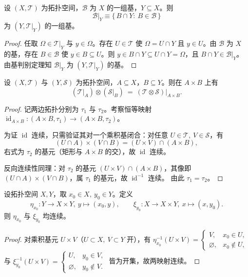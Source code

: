 \documentclass[lang=cn,a4paper,newtx,figureplace=section,tableplace=section]{elegantbook}
\begin{document}
 \begin{proposition}[基在子空间中的限制仍为基]\label{prop:subspace-basis-from-basis}
  设 $(X,\mathcal T)$ 为拓扑空间，$\mathcal B$ 为 $X$ 的一组基，$Y\subseteq X$。则
  \[
   \mathcal B|_Y\equiv\{\,B\cap Y:\ B\in\mathcal B\,\}
  \]
  为 $(Y,\mathcal T|_Y)$ 的一组基。
 \end{proposition}
 \begin{proof}
  任取 $\Omega\in\mathcal T|_Y$ 与 $y\in\Omega$。存在 $U\in\mathcal T$ 使 $\Omega=U\cap Y$ 且 $y\in U$。由 $\mathcal B$ 为 $X$ 的基，存在 $B\in\mathcal B$ 使 $y\in B\subseteq U$。则 $y\in B\cap Y\subseteq U\cap Y=\Omega$，且 $B\cap Y\in\mathcal B|_Y$。由基判别定理知 $\mathcal B|_Y$ 为 $(Y,\mathcal T|_Y)$ 的基。
 \end{proof}
 
 \begin{proposition}[子空间的乘积等于乘积的子空间]\label{prop:product-subspace}
  设 $(X,\mathcal T)$ 与 $(Y,\mathcal S)$ 为拓扑空间，$A\subseteq X$，$B\subseteq Y$。则在 $A\times B$ 上有
  \[
   (\mathcal T|_A)\otimes(\mathcal S|_B)\ =\ (\mathcal T\otimes\mathcal S)\big|_{A\times B}.
  \]
 \end{proposition}
 \begin{proof}
  记两边拓扑分别为 $\tau_1$ 与 $\tau_2$。考察恒等映射 $\operatorname{id}_{A\times B}: (A\times B,\tau_1)\to(A\times B,\tau_2)$。
  
  为证 $\operatorname{id}$ 连续，只需验证其对一个乘积基闭合：对任意 $U\in\mathcal T,\ V\in\mathcal S$，有
  \[
   (U\cap A)\times(V\cap B)=(U\times V)\cap(A\times B),
  \]
  右式为 $\tau_2$ 的基元（矩形与 $A\times B$ 的交），故 $\operatorname{id}$ 连续。
  
  反向连续性同理：对 $\tau_2$ 的基元 $(U\times V)\cap(A\times B)$，其像即 $(U\cap A)\times(V\cap B)$，属 $\tau_1$ 的基元，故 $\operatorname{id}^{-1}$ 连续。
  由此 $\tau_1=\tau_2$。
 \end{proof}
  
 \begin{lemma}[乘积中的常值截面连续]\label{lem:product-constant-sections}
  设拓扑空间 $X,Y$，取 $x_0\in X,\ y_0\in Y$。定义
  \[
   \eta_{x_0}:Y\to X\times Y,\ y\mapsto(x_0,y),\qquad
   \xi_{y_0}:X\to X\times Y,\ x\mapsto(x,y_0).
  \]
  则 $\eta_{x_0}$ 与 $\xi_{y_0}$ 均连续。
 \end{lemma}
 \begin{proof}
  对乘积基元 $U\times V$（$U\subset X,\ V\subset Y$ 开），有
  $\eta_{x_0}^{-1}(U\times V)=\begin{cases} V,& x_0\in U,\\ \varnothing,& x_0\notin U,\end{cases}$
  与 $\xi_{y_0}^{-1}(U\times V)=\begin{cases} U,& y_0\in V,\\ \varnothing,& y_0\notin V.\end{cases}$
  皆为开集，故两映射连续。
 \end{proof}
 
\end{document}

